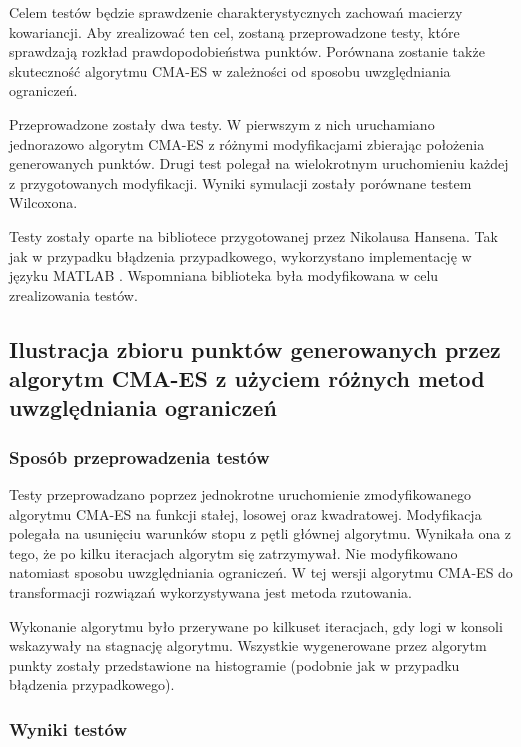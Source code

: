 \documentclass{mini}
\begin{document}
Celem testów będzie sprawdzenie charakterystycznych zachowań macierzy kowariancji. Aby zrealizować ten cel, zostaną przeprowadzone testy, które sprawdzają rozkład prawdopodobieństwa punktów. Porównana zostanie także skuteczność algorytmu CMA-ES w zależności od sposobu uwzględniania ograniczeń.

Przeprowadzone zostały dwa testy. W pierwszym z nich uruchamiano jednorazowo algorytm CMA-ES z różnymi modyfikacjami zbierając położenia generowanych punktów. Drugi test polegał na wielokrotnym uruchomieniu każdej z przygotowanych modyfikacji. Wyniki symulacji zostały porównane testem Wilcoxona.

Testy zostały oparte na bibliotece przygotowanej przez Nikolausa Hansena. Tak jak w przypadku błądzenia przypadkowego, wykorzystano implementację w języku MATLAB \cite{cmaes_code}. Wspomniana biblioteka była modyfikowana w celu zrealizowania testów.

\subsection{Ilustracja zbioru punktów generowanych przez algorytm CMA-ES z użyciem różnych metod uwzględniania ograniczeń}

\subsubsection{Sposób przeprowadzenia testów}
\hspace{3,4ex}Testy przeprowadzano poprzez jednokrotne uruchomienie zmodyfikowanego algorytmu CMA-ES na funkcji stałej, losowej oraz kwadratowej. Modyfikacja polegała na usunięciu warunków stopu z pętli głównej algorytmu. Wynikała ona z tego, że po kilku iteracjach algorytm się zatrzymywał. Nie modyfikowano natomiast sposobu uwzględniania ograniczeń. W tej wersji algorytmu CMA-ES do transformacji rozwiązań wykorzystywana jest metoda rzutowania.

Wykonanie algorytmu było przerywane po kilkuset iteracjach, gdy logi w konsoli wskazywały na stagnację algorytmu. Wszystkie wygenerowane przez algorytm punkty zostały przedstawione na histogramie (podobnie jak w przypadku błądzenia przypadkowego).

\subsubsection{Wyniki testów}
\end{document}
